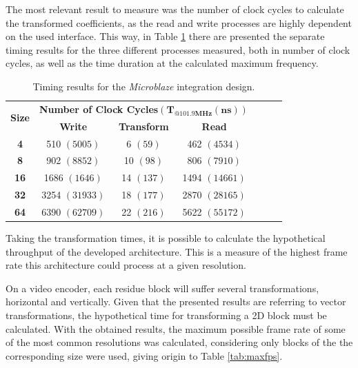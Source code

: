 The most relevant result to measure was the number of clock cycles to calculate the transformed coefficients, as the read and write processes are highly dependent on the used interface. This way, in Table \ref{tab:axi4time} there are presented the separate timing results for the three different processes measured, both in number of clock cycles, as well as the time duration at the calculated maximum frequency. 

\begin{table}[!htpb]
    \centering
    \begin{tabular}{ccccccc} \toprule
        \multirow{2}{*}{\textbf{Size}}   & \multicolumn{3}{c}{\textbf{Number of Clock Cycles}$\mathbf{(T_{@101.9MHz}(ns))}$}                      \\
                                         & \textbf{Write} & \textbf{Transform} & \textbf{Read}  \\ \toprule
        \textbf{4}                       & 510 $(5005)$   & 6 $(59)$           & 462 $(4534)$   \\
        \textbf{8}                       & 902 $(8852)$   & 10 $(98)$          & 806 $(7910)$   \\
        \textbf{16}                      & 1686 $(1646)$  & 14 $(137)$         & 1494 $(14661)$ \\
        \textbf{32}                      & 3254 $(31933)$ & 18 $(177)$         & 2870 $(28165)$ \\
        \textbf{64}                      & 6390 $(62709)$ & 22 $(216)$         & 5622 $(55172)$ \\
        \bottomrule
    \end{tabular}
    \caption{Timing results for the \emph{Microblaze} integration design.}
    \label{tab:axi4time}
\end{table}

Taking the transformation times, it is possible to calculate the hypothetical throughput of the developed architecture. This is a measure of the highest frame rate this architecture could process at a given resolution. 

On a video encoder, each residue block will suffer several transformations, horizontal and vertically. Given that the presented results are referring to vector transformations, the hypothetical time for transforming a 2D block must be calculated. With the obtained results, the maximum possible frame rate of some of the most common resolutions was calculated, considering only blocks of the the corresponding size were used, giving origin to Table \ref{tab:maxfps}.

